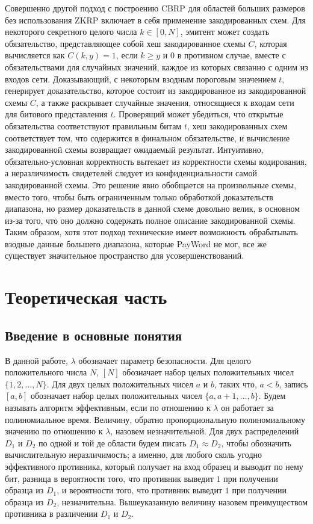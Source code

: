 \documentclass[a4paper]{article}
\begin{document}
	Совершенно другой подход с построению CBRP для областей больших размеров без использования ZKRP включает в себя применение закодированных схем.
	Для некоторого секретного целого числа $k \in [0, N]$, эмитент может создать обязательство, представляющее собой хеш закодированное схемы $C$, которая вычисляется как $C(k, y) = 1$, если $k \geq y$ и $0$ в противном случае, вместе с обязательствами для случайных значений, каждое из которых связанно с одним из входов сети.
	Доказывающий, с некоторым взодным пороговым значением $t$, генерирует доказательство, которое состоит из закодированное из закодированной схемы $C$, а также раскрывает случайные значения, относящиеся к входам сети для битового представления $t$.
	Проверящий может убедиться, что открытые обязательства соответствуют правильным битам $t$, хеш закодированных схем соответствует том, что содержится в финальном обязательстве, и вычисление закодированной схемы возвращает ожидаемый результат.
	Интуитивно, обязательно-условная корректность вытекает из корректности схемы кодирования, а неразличимость свидетелей следует из конфиденциальности самой закодированной схемы.
	Это решение явно обобщается на произвольные схемы, вместо того, чтобы быть ограниченным только обработкой доказательств диапазона, но размер доказательств в данной схеме довольно велик, в основном из-за того, что оно должно содержать полное описание закодированной схемы.
	Таким образом, хотя этот подход технические имеет возможность обрабатывать взодные данные большего диапазона, которые PayWord не мог, все же существует значительное пространство для усовершенствований.


	\section{Теоретическая часть}
	\subsection{Введение в основные понятия} %
	В данной работе, $\lambda$ обозначает параметр безопасности.
	Для целого положительного числа $N$, $[N]$ обозначает набор целых положительных чисел $\{1, 2, \dots, N\}$.
	Для двух целых положительных чисел $a$ и $b$, таких что, $a < b$, запись $[a, b]$ обозначает набор целых положительных чисел $\{a, a + 1, \dots, b\}$.
	Будем называть алгоритм эффективным, если по отношению к $\lambda$ он работает за полиномиальное время.
	Величину, обратно пропорциональную полиномиальному значению по отношению к $\lambda$, назовем незначительной.
	Для двух распределений $D_1$ и $D_2$ по одной и той де области будем писать $D_1 \approx D_2$, чтобы обозначить вычислительную неразличимость; а именно, для любого сколь угодно эффективного противника, который получает на вход образец и выводит по нему бит, разница в вероятности того, что противник выведит $1$ при получении образца из $D_1$, и вероятности того, что противник выведит $1$ при получении образца из $D_2$, незначительна.
	Вышеуказанную величину назовем преимуществом противника в различении $D_1$ и $D_2$.
\end{document}

